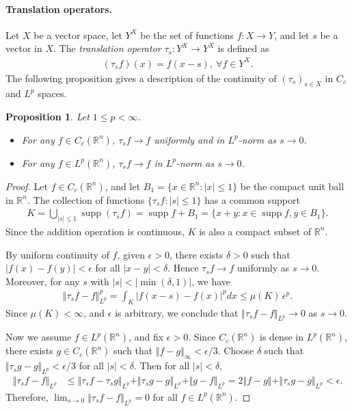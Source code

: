 \documentclass{article}
\numberwithin{equation}{section}
\newcommand{\bbR}{\mathbb{R}}
\DeclareMathOperator{\supp}{supp}
\theoremstyle{plain}
\newtheorem{proposition}[theorem]{Proposition}
\theoremstyle{definition}
\begin{document}
\paragraph{Translation operators.} Let $X$ be a vector space, let $Y^X$ be the set of functions $f:X\to Y$, and let $s$ be a vector in $X$. The \textit{translation operator} $\tau_s:Y^X\to Y^X$ is defined as
\begin{align*}
	(\tau_s f)(x) = f(x-s),\ \forall f\in Y^X.
\end{align*}
The following proposition gives a description of the continuity of $(\tau_s)_{s\in X}$ in $C_c$ and $L^p$ spaces.

\begin{proposition}\label{prop:1.5}
Let $1\leq p < \infty$. 
\begin{itemize}
\item[(i)] For any $f\in C_c(\mathbb{R}^n)$, $\tau_sf\to f$ uniformly and in $L^p$-norm as $s\to 0$.
\item[(ii)] For any $f\in L^p(\mathbb{R}^n)$, $\tau_sf\to f$ in $L^p$-norm as $s\to 0$.
\end{itemize}
\end{proposition}
\begin{proof}
	Let $f\in C_c(\mathbb{R}^n)$, and let $B_1=\{x\in\bbR^n:\vert x\vert\leq 1\}$ be the compact unit ball in $\bbR^n$. The collection of functions $\{\tau_s f: \vert s\vert\leq 1\}$ has a common support
	\begin{align*}
		K = \bigcup_{\vert s\vert\leq 1}\supp(\tau_s f) = \supp f + B_1 = \{x+y:x\in\supp f, y\in B_1\}.
	\end{align*}
	Since the addition operation is continuous, $K$ is also a compact subset of $\bbR^n$.
	
	By uniform continuity of $f$, given $\epsilon>0$, there exists $\delta > 0$ such that $\vert f(x) - f(y)\vert < \epsilon$ for all $\vert x-y\vert < \delta$. Hence $\tau_s f\to f$ uniformly as $s\to 0$. Moreover, for any $s$ with $\vert s\vert<\left\vert\min(\delta,1)\right\vert$, we have
	\begin{align*}
		\Vert\tau_s f-f\Vert_{L^p}^p = \int_K \vert f(x-s) - f(x)\vert^p dx \leq \mu(K)\,\epsilon^p.
	\end{align*}
	Since $\mu(K)<\infty$, and $\epsilon$ is arbitrary, we conclude that $\Vert\tau_s f-f\Vert_{L^p}\to 0$ as $s\to 0$.
	
	Now we assume $f\in L^p(\bbR^n)$, and fix $\epsilon > 0$. Since $C_c(\bbR^n)$ is dense in $L^p(\bbR^n)$, there exists $g\in C_c(\mathbb{R}^n)$ such that $\Vert f-g\Vert_\infty < \epsilon/3$. Choose $\delta$ such that $\Vert\tau_s g -g\Vert_{L^p}<\epsilon/3$ for all $\vert s\vert<\delta$. Then for all $\vert s\vert<\delta$,
	\begin{align*}
		\Vert \tau_s f - f\Vert_{L^p} &\leq \Vert \tau_s f - \tau_s g\Vert_{L^p} + \Vert \tau_s g - g\Vert_{L^p} + \Vert g - f\Vert_{L^p} = 2\Vert f - g\Vert + \Vert\tau_s g -g\Vert_{L^p} < \epsilon.
	\end{align*}
	Therefore, $\lim_{s\to 0}\Vert \tau_s f - f\Vert_{L^p}=0$ for all $f\in L^p(\bbR^n)$.
\end{proof}
\end{document}
